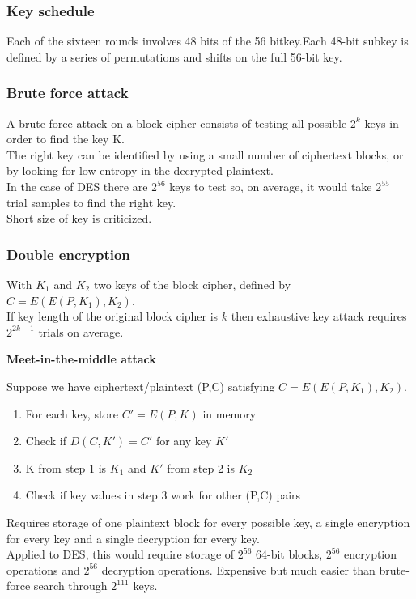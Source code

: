 \documentclass{article}
\begin{document}
\subsubsection{Key schedule}

Each of the sixteen rounds involves 48 bits of the 56 bitkey.Each 48-bit subkey is defined by a series of permutations and shifts on the full 56-bit key.

\subsubsection{Brute force attack}

A brute force attack on a block cipher consists of testing all possible $2^k$ keys in order to find the key K.\\
The right key can be identified by using a small number of ciphertext blocks, or by looking for low entropy in the decrypted plaintext.\\
In the case of DES there are $2^{56}$ keys to test so, on average, it would take $2^{55}$ trial samples to find the right key.\\
Short size of key is criticized.

\subsubsection{Double encryption}

With $K_1$ and $K_2$ two keys of the block cipher, defined by $C = E(E(P,K_1),K_2)$.\\
If key length of the original block cipher is $k$ then exhaustive key attack requires $2^{2k-1}$ trials on average.

\textbf{Meet-in-the-middle attack}

Suppose we have ciphertext/plaintext (P,C) satisfying $C = E(E(P,K_1),K_2)$.
\begin{enumerate}
    \item For each key, store $C' = E(P,K)$ in memory
    \item Check if $D(C,K')=C'$ for any key $K'$
    \item K from step 1 is $K_1$ and $K'$ from step 2 is $K_2$
    \item Check if key values in step 3 work for other (P,C) pairs
\end{enumerate}
Requires storage of one plaintext block for every possible key, a single encryption for every key and a single decryption for every key.\\
Applied to DES, this would require storage of $2^{56}$ 64-bit blocks, $2^{56}$ encryption operations and $2^{56}$ decryption operations. Expensive but much easier than brute-force search through $2^{111}$ keys.
\end{document}
